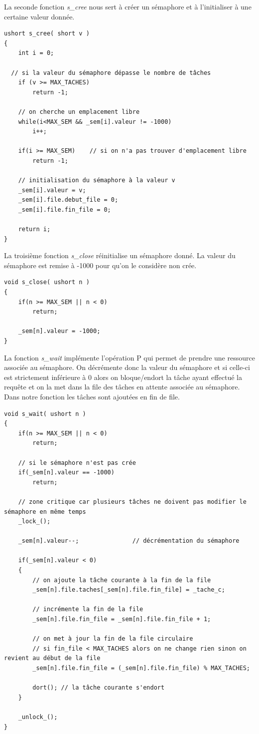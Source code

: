 \documentclass[a4paper,12pt]{report}
\begin{document}
La seconde fonction \textit{s\_cree} nous sert à créer un sémaphore et à l'initialiser à une certaine valeur donnée.\newline

\begin{lstlisting}
ushort s_cree( short v )
{
	int i = 0;

  // si la valeur du sémaphore dépasse le nombre de tâches
	if (v >= MAX_TACHES) 
		return -1;			

	// on cherche un emplacement libre
	while(i<MAX_SEM && _sem[i].valeur != -1000)	
		i++;

	if(i >= MAX_SEM)	// si on n'a pas trouver d'emplacement libre
		return -1;			

	// initialisation du sémaphore à la valeur v
	_sem[i].valeur = v;	
	_sem[i].file.debut_file = 0;	
	_sem[i].file.fin_file = 0;

	return i;
}
\end{lstlisting}

La troisième fonction \textit{s\_close} réinitialise un sémaphore donné. La valeur du sémaphore est remise à -1000 pour qu'on le considère non crée.\newline

\begin{lstlisting}
void s_close( ushort n )
{
	if(n >= MAX_SEM || n < 0)
		return;

	_sem[n].valeur = -1000;
}
\end{lstlisting}

La fonction \textit{s\_wait} implémente l'opération P qui permet de prendre une ressource associée au sémaphore. On décrémente donc la valeur du sémaphore et si celle-ci est strictement inférieure à 0 alors on bloque/endort la tâche ayant effectué la requête et on la met dans la file des tâches en attente associée au sémaphore. Dans notre fonction les tâches sont ajoutées en fin de file.\newline

\begin{lstlisting}
void s_wait( ushort n )
{
	if(n >= MAX_SEM || n < 0)
		return;

	// si le sémaphore n'est pas crée
	if(_sem[n].valeur == -1000)
		return;

	// zone critique car plusieurs tâches ne doivent pas modifier le sémaphore en même temps
	_lock_();			

	_sem[n].valeur--;				// décrémentation du sémaphore

	if(_sem[n].valeur < 0)
	{
		// on ajoute la tâche courante à la fin de la file
		_sem[n].file.taches[_sem[n].file.fin_file] = _tache_c;	
			
		// incrémente la fin de la file
		_sem[n].file.fin_file = _sem[n].file.fin_file + 1;	
			
		// on met à jour la fin de la file circulaire
		// si fin_file < MAX_TACHES alors on ne change rien sinon on revient au début de la file
		_sem[n].file.fin_file = (_sem[n].file.fin_file) % MAX_TACHES; 

		dort();	// la tâche courante s'endort
	}

	_unlock_();
}
\end{lstlisting}
\end{document}
